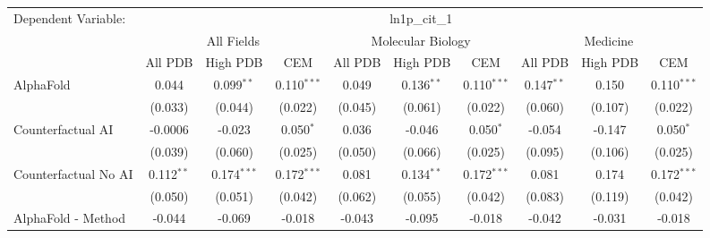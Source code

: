 \begingroup
\centering
\begin{tabular}{lccccccccc}
   \tabularnewline \midrule \midrule
   Dependent Variable: & \multicolumn{9}{c}{ln1p\_cit\_1}\\
 & \multicolumn{3}{c}{All Fields} & \multicolumn{3}{c}{Molecular Biology} & \multicolumn{3}{c}{Medicine} \\
\cmidrule(lr){2-7} \cmidrule(lr){5-10} \cmidrule(lr){8-7}
 & \multicolumn{1}{c}{All PDB} & \multicolumn{1}{c}{High PDB} & \multicolumn{1}{c}{CEM} & \multicolumn{1}{c}{All PDB} & \multicolumn{1}{c}{High PDB} & \multicolumn{1}{c}{CEM} & \multicolumn{1}{c}{All PDB} & \multicolumn{1}{c}{High PDB} & \multicolumn{1}{c}{CEM} \\
\cmidrule(lr){2-3} \cmidrule(lr){3-4} \cmidrule(lr){4-5} \cmidrule(lr){5-6} \cmidrule(lr){6-7} \cmidrule(lr){7-8} \cmidrule(lr){8-9} \cmidrule(lr){9-10} \cmidrule(lr){10-3}
   AlphaFold                                                   & 0.044         & 0.099$^{**}$  & 0.110$^{***}$ & 0.049        & 0.136$^{**}$  & 0.110$^{***}$ & 0.147$^{**}$  & 0.150          & 0.110$^{***}$\\   
                                                               & (0.033)       & (0.044)       & (0.022)       & (0.045)      & (0.061)       & (0.022)       & (0.060)       & (0.107)        & (0.022)\\   
   Counterfactual AI                                           & -0.0006       & -0.023        & 0.050$^{*}$   & 0.036        & -0.046        & 0.050$^{*}$   & -0.054        & -0.147         & 0.050$^{*}$\\   
                                                               & (0.039)       & (0.060)       & (0.025)       & (0.050)      & (0.066)       & (0.025)       & (0.095)       & (0.106)        & (0.025)\\   
   Counterfactual No AI                                        & 0.112$^{**}$  & 0.174$^{***}$ & 0.172$^{***}$ & 0.081        & 0.134$^{**}$  & 0.172$^{***}$ & 0.081         & 0.174          & 0.172$^{***}$\\   
                                                               & (0.050)       & (0.051)       & (0.042)       & (0.062)      & (0.055)       & (0.042)       & (0.083)       & (0.119)        & (0.042)\\   
   AlphaFold - Method                                          & -0.044        & -0.069        & -0.018        & -0.043       & -0.095        & -0.018        & -0.042        & -0.031         & -0.018\\   

\end{tabular}
